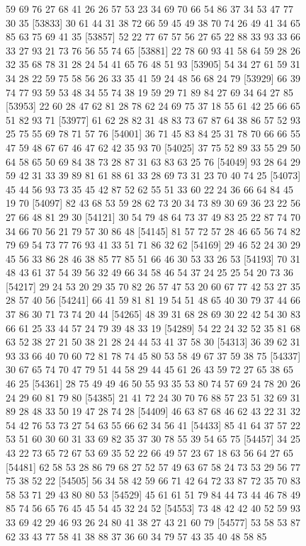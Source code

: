 \documentclass{article}
\begin{document}
\begin{figure}[H]
\begin{Schunk}
\begin{Soutput}
[53809] 59 69 76 27 68 41 26 26 57 53 23 34 69 70 66 54 86 37 34 53 47 77 30 35
[53833] 30 61 44 31 38 72 66 59 45 49 38 70 74 26 49 41 34 65 85 63 75 69 41 35
[53857] 52 22 77 67 57 56 27 65 22 88 33 93 33 66 33 27 93 21 73 76 56 55 74 65
[53881] 22 78 60 93 41 58 64 59 28 26 32 35 68 78 31 28 24 54 41 65 76 48 51 93
[53905] 54 34 27 61 59 31 34 28 22 59 75 58 56 26 33 35 41 59 24 48 56 68 24 79
[53929] 66 39 74 77 93 59 53 48 34 55 74 38 19 59 29 71 89 84 27 69 34 64 27 85
[53953] 22 60 28 47 62 81 28 78 62 24 69 75 37 18 55 61 42 25 66 65 51 82 93 71
[53977] 61 62 28 82 31 48 83 73 67 87 64 38 86 57 52 93 25 75 55 69 78 71 57 76
[54001] 36 71 45 83 84 25 31 78 70 66 66 55 47 59 48 67 67 46 47 62 42 35 93 70
[54025] 37 75 52 89 33 55 29 50 64 58 65 50 69 84 38 73 28 87 31 63 83 63 25 76
[54049] 93 28 64 29 59 42 31 33 39 89 81 61 88 61 33 28 69 73 31 23 70 40 74 25
[54073] 45 44 56 93 73 35 45 42 87 52 62 55 51 33 60 22 24 36 66 64 84 45 19 70
[54097] 82 43 68 53 59 28 62 73 20 34 73 89 30 69 36 23 22 56 27 66 48 81 29 30
[54121] 30 54 79 48 64 73 37 49 83 25 22 87 74 70 34 66 70 56 21 79 57 30 86 48
[54145] 81 57 72 57 28 46 65 56 74 82 79 69 54 73 77 76 93 41 33 51 71 86 32 62
[54169] 29 46 52 24 30 29 45 56 33 86 28 46 38 85 77 85 51 66 46 30 53 33 26 53
[54193] 70 31 48 43 61 37 54 39 56 32 49 66 34 58 46 54 37 24 25 25 54 20 73 36
[54217] 29 24 53 20 29 35 70 82 26 57 47 53 20 60 67 77 42 53 27 35 28 57 40 56
[54241] 66 41 59 81 81 19 54 51 48 65 40 30 79 37 44 66 37 86 30 71 73 74 20 44
[54265] 48 39 31 68 28 69 30 22 42 54 30 83 66 61 25 33 44 57 24 79 39 48 33 19
[54289] 54 22 24 32 52 35 81 68 63 52 38 27 21 50 38 21 28 24 44 53 41 37 58 30
[54313] 36 39 62 31 93 33 66 40 70 60 72 81 78 74 45 80 53 58 49 67 37 59 38 75
[54337] 30 67 65 74 70 47 79 51 44 58 29 44 45 61 26 43 59 72 27 65 38 65 46 25
[54361] 28 75 49 49 46 50 55 93 35 53 80 74 57 69 24 78 20 26 24 29 60 81 79 80
[54385] 21 41 72 24 30 70 76 88 57 23 51 32 69 31 89 28 48 33 50 19 47 28 74 28
[54409] 46 63 87 68 46 62 43 22 31 32 54 42 76 53 73 27 54 63 55 66 62 34 56 41
[54433] 85 41 64 37 57 22 53 51 60 30 60 31 33 69 82 35 37 30 78 55 39 54 65 75
[54457] 34 25 43 22 73 65 72 67 53 69 35 52 22 66 49 57 23 67 18 63 56 64 27 65
[54481] 62 58 53 28 86 79 68 27 52 57 49 63 67 58 24 73 53 29 56 77 75 38 52 22
[54505] 56 34 58 42 59 66 71 42 64 72 33 87 72 35 70 83 58 53 71 29 43 80 80 53
[54529] 45 61 61 51 79 84 44 73 44 46 78 49 85 74 56 65 76 45 45 54 45 32 24 52
[54553] 73 48 42 42 40 52 59 93 33 69 42 29 46 93 26 24 80 41 38 27 43 21 60 79
[54577] 53 58 53 87 62 33 43 77 58 41 38 88 37 36 60 34 79 57 43 35 40 48 58 85

\end{Soutput}
\end{Schunk}
\end{figure}
\end{document}
